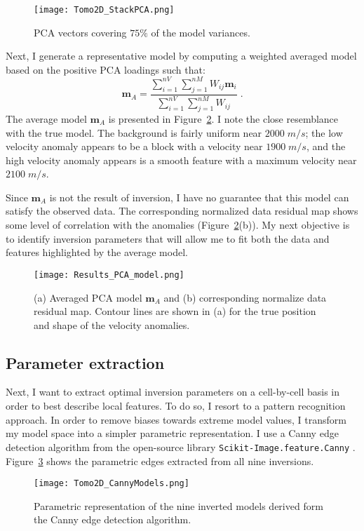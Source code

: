 \begin{figure}
{\centering
\texttt{[image: Tomo2D\_StackPCA.png]}
\caption{PCA vectors covering $75\%$ of the model variances.}\label{PCA_vectors}}
\end{figure}

Next, I generate a representative model by computing a weighted averaged model based on the positive PCA loadings such that:
\begin{equation}\label{weightedaverage}
\mathbf{m}_A = \frac{\sum_{i=1}^{nV} \sum_{j=1}^{nM} W_{ij} \mathbf{m}_i}{ \sum_{i=1}^{nV} \sum_{j=1}^{nM} W_{ij}} \;.
\end{equation}
The average model $\mathbf{m}_A$ is presented in Figure~\ref{PCA_model}. I note the close resemblance with the true model. The background is fairly uniform near $2000\;m/s$; the low velocity anomaly appears to be a block with a velocity near $1900\;m/s$, and the high velocity anomaly appears is a smooth feature with a maximum velocity near $2100\;m/s$.

Since $\mathbf{m}_A$ is not the result of inversion, I have no guarantee that this model can satisfy the observed data.
The corresponding normalized data residual map shows some level of correlation with the anomalies (Figure~\ref{PCA_model}(b)). My next objective is to identify inversion parameters that will allow me to fit both the data and features highlighted by the average model.
\begin{figure}
{\centering
\texttt{[image: Results\_PCA\_model.png]}
\caption{(a) Averaged PCA model $\mathbf{m}_A$ and (b) corresponding normalize data residual map. Contour lines are shown in (a) for the true position and shape of the velocity anomalies.}\label{PCA_model}}
\end{figure}

\subsection{Parameter extraction}
Next, I want to extract optimal inversion parameters on a cell-by-cell basis in order to best describe local features. To do so, I resort to a pattern recognition approach. In order to remove biases towards extreme model values, I transform my model space into a simpler parametric representation. I use a Canny edge detection algorithm from the open-source library \texttt{Scikit-Image.feature.Canny} \cite[]{Pedregosa2011}.
Figure~\ref{CannyEdges} shows the parametric edges extracted from all nine inversions.
\begin{figure}
\texttt{[image: Tomo2D\_CannyModels.png]}
\caption{Parametric representation of the nine inverted models derived form the Canny edge detection algorithm.}
\label{CannyEdges}
\end{figure}

